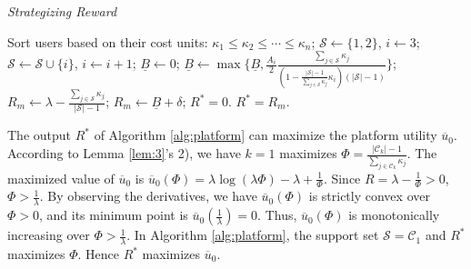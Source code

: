 \documentclass{IEEEtran}
\begin{document}
\begin{algorithm}[!t]
\begin{small}
\caption{\emph{Strategizing Reward}}
\label{alg:platform}
\renewcommand{\algorithmicrequire}{\textbf{Input:}}
\renewcommand{\algorithmicensure}{\textbf{Output:}}
\begin{algorithmic}[1]
\State Sort users based on their cost units: $\kappa_1 \leq \kappa_2 \leq \cdots \leq \kappa_n$;
\State $\mathcal{S} \leftarrow \{1,2\}$, $i \leftarrow 3$;
	\State $\mathcal{S} \leftarrow \mathcal{S} \cup \{i\}$, $i \leftarrow i+1$;
\EndWhile
\State $\underline{B} \leftarrow 0$;
	\State $\underline{B} \leftarrow \max\{\underline{B}, \frac{A_i}{2}\frac{\sum_{j\in\mathcal{S}}\kappa_j}{(1-\frac{|\mathcal{S}|-1}{\sum_{j\in\mathcal{S}}\kappa_j}\kappa_i)(|\mathcal{S}|-1)}\}$;
\EndFor
{}
	\State $R_m \leftarrow \lambda-\frac{\sum_{j\in\mathcal{S}}\kappa_j}{|\mathcal{S}|-1}$;
\Else
	\State $R_m \leftarrow \underline{B}+\delta$;
\EndIf
{}
	 $R^*=0$.
\Else
	 $R^*=R_m$.
\EndIf
\end{algorithmic}
\end{small}
\end{algorithm}

The output $R^*$ of Algorithm \ref{alg:platform} can maximize the platform utility $\overline{u}_0$. According to Lemma \ref{lem:3}'s 2), we have $k=1$ maximizes $\Phi = \frac{|\mathcal{C}_k|-1}{\sum_{j\in\mathcal{C}_k}\kappa_j}$. The maximized value of $\overline{u}_0$ is $\overline{u}_0(\Phi)=\lambda\log{(\lambda\Phi)}-\lambda+\frac{1}{\Phi}$. Since $R=\lambda-\frac{1}{\Phi}>0$, $\Phi>\frac{1}{\lambda}$. By observing the derivatives, we have $\overline{u}_0(\Phi)$ is strictly convex over $\Phi > 0$, and its minimum point is $\overline{u}_0(\frac{1}{\lambda})=0$. Thus, $\overline{u}_0(\Phi)$ is monotonically increasing over $\Phi > \frac{1}{\lambda}$. In Algorithm \ref{alg:platform}, the support set $\mathcal{S}=\mathcal{C}_1$ and $R^*$ maximizes $\Phi$. Hence $R^*$ maximizes $\overline{u}_0$.
\end{document}
